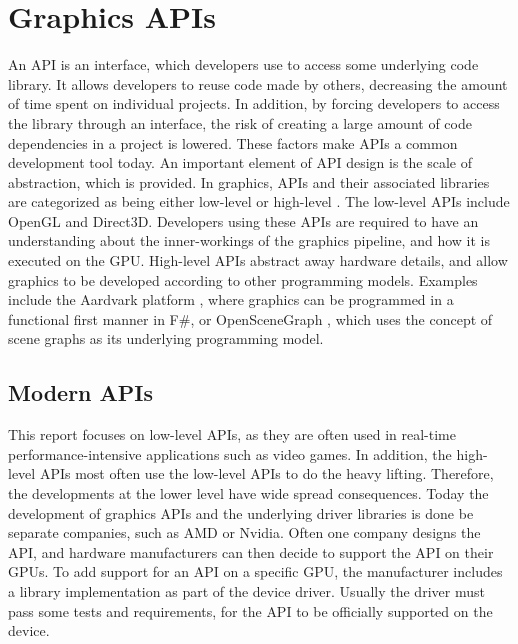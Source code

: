 \section{Graphics APIs}\label{sec:graphics_apis}
An \gls{API} is an interface, which developers use to access some underlying code library. 
It allows developers to reuse code made by others, decreasing the amount of time spent on individual projects.
In addition, by forcing developers to access the library through an interface, the risk of creating a large amount of code dependencies in a project is lowered.
These factors make \glspl{API} a common development tool today.\cite{apiEvaluation}
An important element of \gls{API} design is the scale of abstraction, which is provided.
In graphics, \glspl{API} and their associated libraries are categorized as being either low-level or high-level \cite{wikiGraphicsLibs}.
The low-level \glspl{API} include OpenGL and Direct3D. Developers using these \glspl{API} are required to have an understanding about the inner-workings of the graphics pipeline, and how it is executed on the \gls{GPU}.
High-level \glspl{API} abstract away hardware details, and allow graphics to be developed according to other programming models.
Examples include the Aardvark platform \cite{aardvark}, where graphics can be programmed in a functional first manner in F\#, or OpenSceneGraph \cite{openSceneGraph}, which uses the concept of scene graphs as its underlying programming model. 

\subsection{Modern APIs}
This report focuses on low-level \glspl{API}, as they are often used in real-time performance-intensive applications such as video games.
In addition, the high-level \glspl{API} most often use the low-level \glspl{API} to do the heavy lifting.
Therefore, the developments at the lower level have wide spread consequences.
Today the development of graphics \glspl{API} and the underlying driver libraries is done be separate companies, such as AMD or Nvidia.
Often one company designs the \gls{API}, and hardware manufacturers can then decide to support the \gls{API} on their \glspl{GPU}.
To add support for an \gls{API} on a specific \gls{GPU}, the manufacturer includes a library implementation as part of the device driver.
Usually the driver must pass some tests and requirements, for the \gls{API} to be officially supported on the device.   

